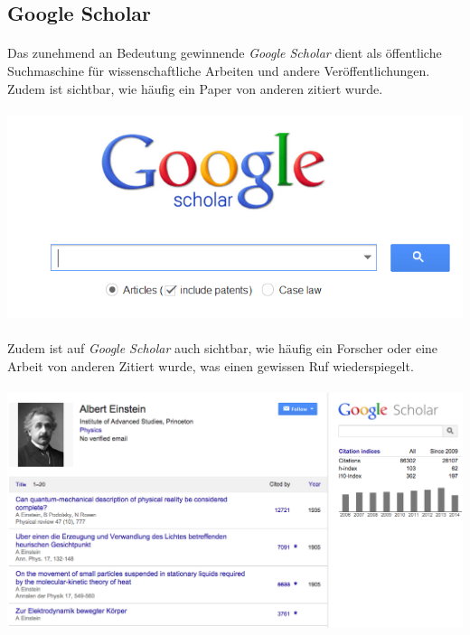 \documentclass[10pt, a4paper]{article}
\begin{document}
\subsection{Google Scholar}
\paragraph{}
Das zunehmend an Bedeutung gewinnende \textit{Google Scholar} dient als öffentliche Suchmaschine für wissenschaftliche Arbeiten und andere Veröffentlichungen. Zudem ist sichtbar, wie häufig ein Paper von anderen zitiert wurde.\par
\paragraph{}
\begin{center}
\includegraphics[scale=0.7]{GS1.png}
\end{center}\par
\paragraph{}
Zudem ist auf \textit{Google Scholar} auch sichtbar, wie häufig ein Forscher oder eine Arbeit von anderen Zitiert wurde, was einen gewissen Ruf wiederspiegelt.\par
\paragraph{}
\begin{center}
\includegraphics[scale=0.3]{ae.png}
\end{center}\par
\end{document}
